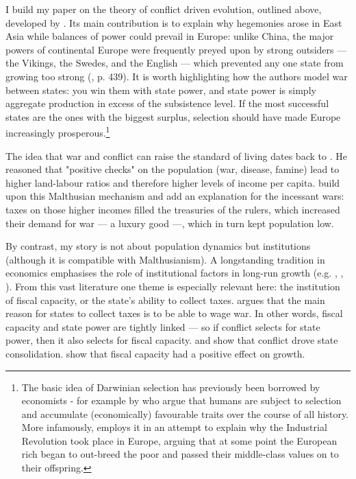 \documentclass[11pt, a4paper]{article}
\begin{document}
I build my paper on the theory of conflict driven evolution, outlined above, developed by \cite{levine2013, levine2021, levine2022}. Its main contribution is to explain why hegemonies arose in East Asia while balances of power could prevail in Europe: unlike China, the major powers of continental Europe were frequently preyed upon by strong outsiders --- the Vikings, the Swedes, and the English --- which prevented any one state from growing too strong (\citealp{levine2021}, p. 439). It is worth highlighting how the authors model war between states: you win them with state power, and state power is simply aggregate production in excess of the subsistence level. If the most successful states are the ones with the biggest surplus, selection should have made Europe increasingly prosperous.\footnote
{
The basic idea of Darwinian selection has previously been borrowed by economists - for example by \cite{galor2002} who argue that humans are subject to selection and accumulate (economically) favourable traits over the course of all history. More infamously, \cite{clark2007} employs it in an attempt to explain why the Industrial Revolution took place in Europe, arguing that at some point the European rich began to out-breed the poor and passed their middle-class values on to their offspring.
}

The idea that war and conflict can raise the standard of living dates back to \cite{malthus1798}. He reasoned that "positive checks" on the population (war, disease, famine) lead to higher land-labour ratios and therefore higher levels of income per capita. \cite{voigtlnder2013} build upon this Malthusian mechanism and add an explanation for the incessant wars: taxes on those higher incomes filled the treasuries of the rulers, which increased their demand for war --- a luxury good ---, which in turn kept population low. 

By contrast, my story is not about population dynamics but institutions (although it is compatible with Malthusianism). A longstanding tradition in economics emphasises the role of institutional factors in long-run growth (e.g. \cite{north1970}, \cite{delong1993}, \cite{ajr2001}). From this vast literature one theme is especially relevant here: the institution of fiscal capacity, or the state's ability to collect taxes. \cite{tilly1985} argues that the main reason for states to collect taxes is to be able to wage war. In other words, fiscal capacity and state power are tightly linked --- so if conflict selects for state power, then it also selects for fiscal capacity. \cite{gennaioli2015} and \cite{cantoni2023} show that conflict drove state consolidation. \cite{dincecco2012} show that fiscal capacity had a positive effect on growth.
\end{document}
